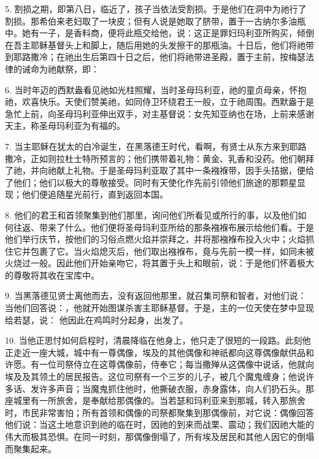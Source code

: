 5. 割损之期，即第八日，临近了，孩子当依法受割损。于是他们在洞中为祂行了割损。那希伯来老妇取了一块皮；但有人说是她取了脐带，置于一古纳尔多油瓶中。她有一子，是香料商，便将此瓶交给他，说：这正是罪妇玛利亚所购买，倾倒在吾主耶稣基督头上和脚上，随后用她的头发擦干的那瓶油。十日后，他们将祂带到耶路撒冷；在祂出生后第四十日之后，他们将祂带进圣殿，置于主前，按梅瑟法律的诫命为祂献祭，即：\par

6. 当时年迈的西默盎看见祂如光柱照耀，当时圣母玛利亚，祂的童贞母亲，怀抱祂，欢喜快乐。天使们赞美祂，如同侍卫环绕君王一般，立于祂周围。西默盎于是急忙上前，向圣母玛利亚伸出双手，对主基督说：女先知亚纳也在场，上前来感谢天主，称圣母玛利亚为有福的。\par

7. 当主耶稣在犹太的白冷诞生，在黑落德王时代，看啊，有贤士从东方来到耶路撒冷，正如则拉杜士特所预言的；他们携带着礼物：黄金、乳香和没药。他们朝拜了祂，并向祂献上礼物。于是圣母玛利亚取了其中一条襁褓带，因手头拮据，便给了他们；他们以极大的尊敬接受。同时有天使化作先前引领他们旅途的那颗星显现；他们便追随星光前行，直到返回本国。\par

8. 他们的君王和首领聚集到他们那里，询问他们所看见或所行的事，以及他们如何往返、带来了什么。他们便将圣母玛利亚所给的那条襁褓布展示给他们看。于是他们举行庆节，按他们的习俗点燃火焰并崇拜之，并将那襁褓布投入火中；火焰抓住它并包裹了它。当火焰熄灭后，他们取出襁褓布，竟与先前一模一样，如同未被火烧过一般。因此他们开始亲吻它，将其置于头上和眼前，说：于是他们怀着极大的尊敬将其收在宝库中。\par

9. 当黑落德见贤士离他而去，没有返回他那里，就召集司祭和智者，对他们说：当他们回答说：，他就开始图谋杀害主耶稣基督。于是，主的一位天使在梦中显现给若瑟，说： 他因此在鸡鸣时分起身，出发了。\par

10. 当他正思忖如何启程时，清晨降临在他身上，他只走了很短的一段路。此刻他正走近一座大城，城中有一尊偶像，埃及的其他偶像和神祇都向这尊偶像献供品和许愿。有一位司祭侍立在这尊偶像前，侍奉它；每当撒殚从这偶像中说话，他就向埃及及其领土的居民报告。这位司祭有一个三岁的儿子，被几个魔鬼缠身；他说许多话、发许多声音；当魔鬼抓住他时，他撕破衣服，赤身露体，向人们扔石头。那座城里有一所旅舍，是奉献给那偶像的。当若瑟和玛利亚来到那城，转入那旅舍时，市民非常害怕；所有首领和偶像的司祭都聚集到那偶像前，对它说：偶像回答他们说：当这土地意识到祂的临在时，因祂的到来而战栗、震动；我们因祂大能的伟大而极其恐惧。在同一时刻，那偶像倒塌了，所有埃及居民和其他人因它的倒塌而聚集起来。\par

